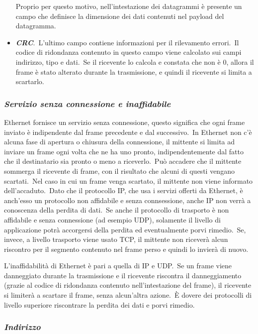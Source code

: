 \begin{itemize}
          Proprio per questo motivo, nell'intestazione dei datagrammi è presente un campo che definisce la dimensione dei dati contenuti nel payload del datagramma.
    \item\textbf{\emph{CRC}}.\
          L'ultimo campo contiene informazioni per il rilevamento errori.\
          Il codice di ridondanza contenuto in questo campo viene calcolato sui campi indirizzo, tipo e dati.\
          Se il ricevente lo calcola e constata che non è 0, allora il frame è stato alterato durante la trasmissione, e quindi il ricevente si limita a scartarlo.
\end{itemize}

\subsubsection{\emph{Servizio senza connessione e inaffidabile}}

Ethernet fornisce un servizio senza connessione, questo significa che ogni frame inviato è indipendente dal frame precedente e dal successivo.\
In Ethernet non c'è alcuna fase di apertura o chiusura della connessione, il mittente si limita ad inviare un frame ogni volta che ne ha uno pronto, indipendentemente dal fatto che il destinatario sia pronto o meno a riceverlo.\
Può accadere che il mittente sommerga il ricevente di frame, con il risultato che alcuni di questi vengano scartati.\
Nel caso in cui un frame venga scartato, il mittente non viene informato dell'accaduto.\
Dato che il protocollo IP, che usa i servizi offerti da Ethernet, è anch'esso un protocollo non affidabile e senza connsessione, anche IP non verrà a conoscenza della perdita di dati.\
Se anche il protocollo di trasporto è non affidabile e senza connessione (ad esempio UDP), solamente il livello di applicazione potrà accorgersi della perdita ed eventualmente porvi rimedio.\
Se, invece, a livello trasporto viene usato TCP, il mittente non riceverà alcun riscontro per il segmento contenuto nel frame perso e quindi lo invierà di nuovo.

L'inaffidabilità di Ethernet è pari a quella di IP e UDP.\
Se un frame viene danneggiato durante la trasmissione e il ricevente riscontra il danneggiamento (grazie al codice di ridondanza contenuto nell'intestazione del frame), il ricevente si limiterà a scartare il frame, senza alcun'altra azione.\
È dovere dei protocolli di livello superiore riscontrare la perdita dei dati e porvi rimedio.

\subsubsection{\emph{Indirizzo}}

